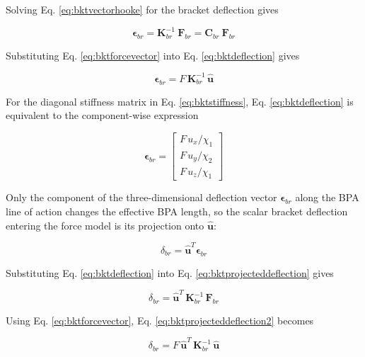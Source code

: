 Solving Eq. \ref{eq:bktvectorhooke} for the bracket deflection gives

\begin{equation}
\boldsymbol{\epsilon}_{br} = \mathbf{K}_{br}^{-1} \: \mathbf{F}_{br} = \mathbf{C}_{br} \: \mathbf{F}_{br}
\label{eq:bktdeflection}
\end{equation}

Substituting Eq. \ref{eq:bktforcevector} into Eq. \ref{eq:bktdeflection} gives

\begin{equation}
\boldsymbol{\epsilon}_{br} = F \,\mathbf{K}_{br}^{-1} \,\hat{\mathbf{u}}
\label{eq:bktdeflectionforceunit}
\end{equation}

For the diagonal stiffness matrix in Eq. \ref{eq:bktstiffness}, Eq. \ref{eq:bktdeflection} is equivalent to the component-wise expression

\begin{equation}
\boldsymbol{\epsilon}_{br} = \begin{bmatrix} F\,u_{x}/\chi_{1} \\ F\,u_{y}/\chi_{2} \\ F\,u_{z}/\chi_{1} \end{bmatrix}
\label{eq:bktcomponentdeflection}
\end{equation}

Only the component of the three-dimensional deflection vector $\boldsymbol{\epsilon}_{br}$ along the BPA line of action changes the effective BPA length, so the scalar bracket deflection entering the force model is its projection onto $\hat{\mathbf{u}}$:

\begin{equation}
{\delta}_{br} = \hat{\mathbf{u}}^{T} \boldsymbol{\epsilon}_{br}
\label{eq:bktprojecteddeflection}
\end{equation}

Substituting Eq. \ref{eq:bktdeflection} into Eq. \ref{eq:bktprojecteddeflection} gives

\begin{equation}
{\delta}_{br} = \hat{\mathbf{u}}^{T} \, \mathbf{K}_{br}^{-1} \, \mathbf{F}_{br}
\label{eq:bktprojecteddeflection2}
\end{equation}

Using Eq. \ref{eq:bktforcevector}, Eq. \ref{eq:bktprojecteddeflection2} becomes

\begin{equation}
\delta_{br} = F\, \hat{\mathbf{u}}^{T} \, \mathbf{K}_{br}^{-1} \, \hat{\mathbf{u}}
\label{eq:bktprojectedcompliance}
\end{equation}

